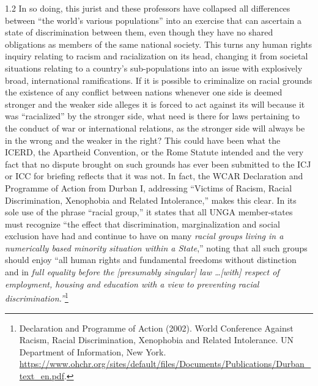 \documentclass[../unravbook.tex]{subfiles}
\begin{document}
\begin{spacing}{1.2}
In so doing, this jurist and these professors have collapsed all differences between ``the world's various populations'' into an exercise that can ascertain a state of discrimination between them, even though they have no shared obligations as members of the same national society. This turns any human rights inquiry relating to racism and racialization on its head, changing it from societal situations relating to a country's sub-populations into an issue with explosively broad, international ramifications. If it is possible to criminalize on racial grounds the existence of any conflict between nations whenever one side is deemed stronger and the weaker side alleges it is forced to act against its will because it was \enquote{racialized} by the stronger side, what need is there for laws pertaining to the conduct of war or international relations, as the stronger side will always be in the wrong and the weaker in the right? This could have been what the ICERD, the Apartheid Convention, or the Rome Statute intended and the very fact that no dispute brought on such grounds has ever been submitted to the ICJ or ICC for briefing reflects that it was not. In fact, the WCAR Declaration and Programme of Action from Durban I, addressing ``Victims of Racism, Racial Discrimination, Xenophobia and Related Intolerance,'' makes this clear. In its sole use of the phrase ``racial group,'' it states that all UNGA member-states must recognize ``the effect that discrimination, marginalization and social exclusion have had and continue to have on many \textit{racial groups living in a numerically based minority situation within a State},'' noting that all such groups should enjoy ``all human rights and fundamental freedoms without distinction and in \textit{full equality before the [presumably singular] law \ldots  [with] respect of employment, housing and education with a view to preventing racial discrimination.''}\footnote{Declaration and Programme of Action (2002). World Conference Against Racism, Racial Discrimination, Xenophobia and Related Intolerance. UN Department of Information, New York. \url{https://www.ohchr.org/sites/default/files/Documents/Publications/Durban_text_en.pdf}.} 


\end{spacing}
\end{document}
